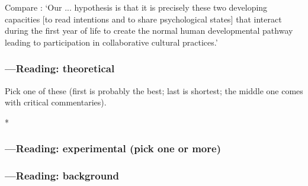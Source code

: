 \documentclass[12pt,\papersize]{extarticle}
\begin{document}
Compare \citet[p. 688]{Tomasello:2005wx}: ‘Our ... hypothesis is that it is precisely these two developing capacities [to read intentions and to share psychological states]  that interact during the first year of life to create the normal human developmental pathway leading to participation in collaborative cultural practices.’




\subsubsection{---Reading: theoretical}
Pick one of these (first is probably the best; last is shortest; the middle one comes with critical commentaries).

*




\subsubsection{---Reading: experimental (pick one or more)}




\subsubsection{---Reading: background}





%
\end{document}
